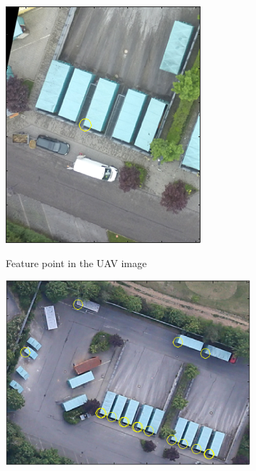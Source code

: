 \begin{figure}[tbp]
    \centering
       \begin{subfigure}[b]{0.25\columnwidth}
           \centering
           \includegraphics[width=\textwidth]{figures_4/gt_match_repetetion_uav.png}
           \caption{Feature point in the UAV image}%
           {{\small }}
           \label{fig:ontomany_a}
       \end{subfigure}
	   \hspace{0.075\columnwidth}
       \begin{subfigure}[b]{0.4\columnwidth}  
           \centering 
           \includegraphics[width=\textwidth]{figures_4/gt_match_repetetion_air.png}

\end{subfigure}
\end{figure}
